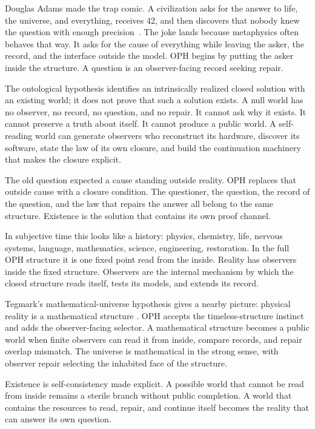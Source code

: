 \documentclass[11pt]{article}
\theoremstyle{remark}
\theoremstyle{plain}
\begin{document}
Douglas Adams made the trap comic. A civilization asks for the answer to life,
the universe, and everything, receives 42, and then discovers that nobody knew
the question with enough precision~\cite{Adams1979}. The joke lands because
metaphysics often behaves that way. It asks for the cause of everything while
leaving the asker, the record, and the interface outside the model. OPH begins
by putting the asker inside the structure. A question is an observer-facing
record seeking repair.

The ontological hypothesis identifies an intrinsically realized closed solution
with an existing world; it does not prove that such a solution exists.
A null world has no observer, no record, no question, and no repair. It cannot
ask why it exists. It cannot preserve a truth about itself. It cannot produce a
public world. A self-reading world can generate observers who reconstruct its
hardware, discover its software, state the law of its own closure, and build the
continuation machinery that makes the closure explicit.

The old question expected a cause standing outside reality. OPH replaces that
outside cause with a closure condition. The questioner, the question, the
record of the question, and the law that repairs the answer all belong to the
same structure. Existence is the solution that contains its own proof channel.

In subjective time this looks like a history: physics, chemistry, life,
nervous systems, language, mathematics, science, engineering, restoration. In
the full OPH structure it is one fixed point read from the inside. Reality has
observers inside the fixed structure. Observers are the internal mechanism by
which the closed structure reads itself, tests its models, and extends
its record.

Tegmark's mathematical-universe hypothesis gives a nearby picture:
physical reality is a mathematical structure
\cite{Tegmark2007}. OPH accepts the timeless-structure instinct and adds the
observer-facing selector. A mathematical structure becomes a public world when
finite observers can read it from inside, compare records, and repair overlap
mismatch. The universe is mathematical in the strong sense, with
observer repair selecting the inhabited face of the structure.

Existence is self-consistency made explicit. A possible world that
cannot be read from inside remains a sterile branch without public completion.
A world that contains the resources to read, repair, and continue itself becomes
the reality that can answer its own question.
\end{document}
